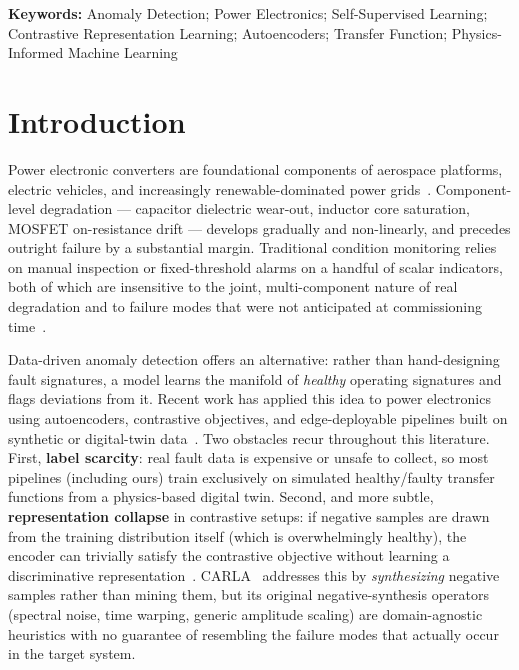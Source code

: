 \documentclass[11pt,a4paper]{article}
\begin{document}
\noindent\textbf{Keywords:} Anomaly Detection; Power Electronics; Self-Supervised Learning;
Contrastive Representation Learning; Autoencoders; Transfer Function; Physics-Informed
Machine Learning

\section{Introduction}
\label{sec:intro}

Power electronic converters are foundational components of aerospace platforms, electric
vehicles, and increasingly renewable-dominated power grids~\cite{idrisov2025digitaltwin}.
Component-level degradation --- capacitor dielectric wear-out, inductor core saturation,
MOSFET on-resistance drift --- develops gradually and non-linearly, and precedes outright
failure by a substantial margin. Traditional condition monitoring relies on manual
inspection or fixed-threshold alarms on a handful of scalar indicators, both of which are
insensitive to the joint, multi-component nature of real degradation and to failure modes
that were not anticipated at commissioning time~\cite{liu2022review,kou2022faultdiagnosis}.

Data-driven anomaly detection offers an alternative: rather than hand-designing fault
signatures, a model learns the manifold of \emph{healthy} operating signatures and flags
deviations from it. Recent work has applied this idea to power electronics using
autoencoders, contrastive objectives, and edge-deployable pipelines built on synthetic or
digital-twin data~\cite{beattie2022robust,gomez2023selfcommissioning,idrisov2025digitaltwin}.
Two obstacles recur throughout this literature. First, \textbf{label scarcity}: real fault
data is expensive or unsafe to collect, so most pipelines (including ours) train
exclusively on simulated healthy/faulty transfer functions from a physics-based digital
twin. Second, and more subtle, \textbf{representation collapse} in contrastive setups: if
negative samples are drawn from the training distribution itself (which is overwhelmingly
healthy), the encoder can trivially satisfy the contrastive objective without learning a
discriminative representation~\cite{chen2023harnessing}. CARLA~\cite{darban2023carla}
addresses this by \emph{synthesizing} negative samples rather than mining them, but its
original negative-synthesis operators (spectral noise, time warping, generic amplitude
scaling) are domain-agnostic heuristics with no guarantee of resembling the failure modes
that actually occur in the target system.
\end{document}
